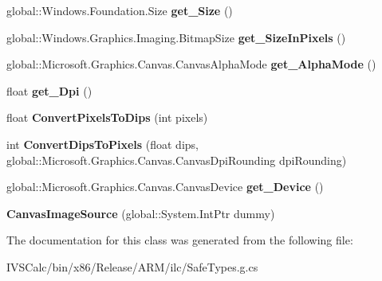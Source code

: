 \begin{DoxyCompactItemize}
\mbox{\label{class_microsoft_1_1_graphics_1_1_canvas_1_1_u_i_1_1_xaml_1_1_canvas_image_source_af6b41894fff7260ce3d135535154a2f8}} 
global\+::\+Windows.\+Foundation.\+Size {\bfseries get\+\_\+\+Size} ()
\item 
\mbox{\label{class_microsoft_1_1_graphics_1_1_canvas_1_1_u_i_1_1_xaml_1_1_canvas_image_source_a72c58fbab36a0813c0b2a0ad322cda40}} 
global\+::\+Windows.\+Graphics.\+Imaging.\+Bitmap\+Size {\bfseries get\+\_\+\+Size\+In\+Pixels} ()
\item 
\mbox{\label{class_microsoft_1_1_graphics_1_1_canvas_1_1_u_i_1_1_xaml_1_1_canvas_image_source_ab8ec1acb948333164b399e976958555c}} 
global\+::\+Microsoft.\+Graphics.\+Canvas.\+Canvas\+Alpha\+Mode {\bfseries get\+\_\+\+Alpha\+Mode} ()
\item 
\mbox{\label{class_microsoft_1_1_graphics_1_1_canvas_1_1_u_i_1_1_xaml_1_1_canvas_image_source_acab54624adff2f4ef719b6d792103ab8}} 
float {\bfseries get\+\_\+\+Dpi} ()
\item 
\mbox{\label{class_microsoft_1_1_graphics_1_1_canvas_1_1_u_i_1_1_xaml_1_1_canvas_image_source_a7a73b33b06b461575d0599cc9586b78e}} 
float {\bfseries Convert\+Pixels\+To\+Dips} (int pixels)
\item 
\mbox{\label{class_microsoft_1_1_graphics_1_1_canvas_1_1_u_i_1_1_xaml_1_1_canvas_image_source_a5527b19721b109df85d06d449a3d6f6a}} 
int {\bfseries Convert\+Dips\+To\+Pixels} (float dips, global\+::\+Microsoft.\+Graphics.\+Canvas.\+Canvas\+Dpi\+Rounding dpi\+Rounding)
\item 
\mbox{\label{class_microsoft_1_1_graphics_1_1_canvas_1_1_u_i_1_1_xaml_1_1_canvas_image_source_aab3581e1ce35b89a948dc0025e5aaa14}} 
global\+::\+Microsoft.\+Graphics.\+Canvas.\+Canvas\+Device {\bfseries get\+\_\+\+Device} ()
\item 
\mbox{\label{class_microsoft_1_1_graphics_1_1_canvas_1_1_u_i_1_1_xaml_1_1_canvas_image_source_a274b866a61b2dc07e5c6c8ab2510ac87}} 
{\bfseries Canvas\+Image\+Source} (global\+::\+System.\+Int\+Ptr dummy)
\end{DoxyCompactItemize}


The documentation for this class was generated from the following file\+:\begin{DoxyCompactItemize}
\item 
I\+V\+S\+Calc/bin/x86/\+Release/\+A\+R\+M/ilc/Safe\+Types.\+g.\+cs\end{DoxyCompactItemize}
